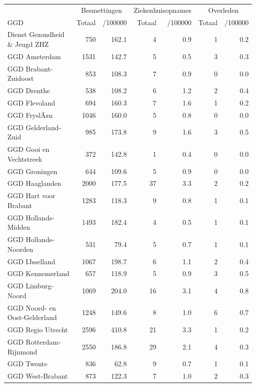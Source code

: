 \documentclass[
  english,
  man,floatsintext]{apa6}
\begin{document}
\begin{table}
\centering\begingroup\fontsize{10}{12}\selectfont

\begin{threeparttable}
\begin{tabular}{lrrrrrr}
\toprule
\multicolumn{1}{c}{ } & \multicolumn{2}{c}{Besmettingen} & \multicolumn{2}{c}{Ziekenhuisopnames} & \multicolumn{2}{c}{Overleden} \\
\cmidrule(l{3pt}r{3pt}){2-3} \cmidrule(l{3pt}r{3pt}){4-5} \cmidrule(l{3pt}r{3pt}){6-7}
GGD & Totaal & /100000 & Totaal & /100000 & Totaal & /100000\\
\midrule
Dienst Gezondheid \& Jeugd ZHZ & 750 & 162.1 & 4 & 0.9 & 1 & 0.2\\
GGD Amsterdam & 1531 & 142.7 & 5 & 0.5 & 3 & 0.3\\
GGD Brabant-Zuidoost & 853 & 108.3 & 7 & 0.9 & 0 & 0.0\\
GGD Drenthe & 538 & 108.2 & 6 & 1.2 & 2 & 0.4\\
GGD Flevoland & 694 & 160.3 & 7 & 1.6 & 1 & 0.2\\
GGD FryslÃ¢n & 1046 & 160.0 & 5 & 0.8 & 0 & 0.0\\
GGD Gelderland-Zuid & 985 & 173.8 & 9 & 1.6 & 3 & 0.5\\
GGD Gooi en Vechtstreek & 372 & 142.8 & 1 & 0.4 & 0 & 0.0\\
GGD Groningen & 644 & 109.6 & 5 & 0.9 & 0 & 0.0\\
GGD Haaglanden & 2000 & 177.5 & 37 & 3.3 & 2 & 0.2\\
GGD Hart voor Brabant & 1283 & 118.3 & 9 & 0.8 & 1 & 0.1\\
GGD Hollands-Midden & 1493 & 182.4 & 4 & 0.5 & 1 & 0.1\\
GGD Hollands-Noorden & 531 & 79.4 & 5 & 0.7 & 1 & 0.1\\
GGD IJsselland & 1067 & 198.7 & 6 & 1.1 & 2 & 0.4\\
GGD Kennemerland & 657 & 118.9 & 5 & 0.9 & 3 & 0.5\\
GGD Limburg-Noord & 1069 & 204.0 & 16 & 3.1 & 4 & 0.8\\
GGD Noord- en Oost-Gelderland & 1248 & 149.6 & 8 & 1.0 & 6 & 0.7\\
GGD Regio Utrecht & 2596 & 410.8 & 21 & 3.3 & 1 & 0.2\\
GGD Rotterdam-Rijnmond & 2550 & 186.8 & 29 & 2.1 & 4 & 0.3\\
GGD Twente & 836 & 62.8 & 9 & 0.7 & 1 & 0.1\\
GGD West-Brabant & 873 & 122.3 & 7 & 1.0 & 2 & 0.3\\

\end{tabular}
\end{threeparttable}
\end{table}
\end{document}
